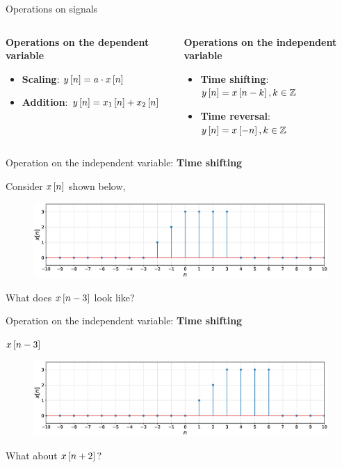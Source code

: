 \documentclass[aspectratio=169]{beamer}
\let\olditem\item
\renewcommand{\item}{\setlength{\itemsep}{\fill}\olditem}
\def\ls{\ensuremath\left[}
\def\rs{\ensuremath\right]}
\begin{document}
\begin{frame}[t]{Operations on signals}

\begin{columns}[t]
  \begin{column}{.45\linewidth}
  \textbf{Operations on the dependent variable}
  \begin{itemize}
    \item \textbf{Scaling}: $y\ls n \rs = a \cdot x\ls n \rs$
    \item \textbf{Addition}: $y\ls n \rs = x_1\ls n \rs + x_2\ls n \rs$
  \end{itemize}
  \end{column}

  \begin{column}{.48\linewidth}
  \textbf{Operations on the independent variable}
  \begin{itemize}
    \item \textbf{Time shifting}: $y\ls n \rs = x \ls n - k \rs, k \in \mathbb{Z}$
    \item \textbf{Time reversal}: $y\ls n \rs = x \ls -n \rs, k \in \mathbb{Z}$
  \end{itemize}
  \end{column}
\end{columns}

\end{frame}

\begin{frame}{Operation on the independent variable: \textbf{Time shifting}}

Consider $x\ls n \rs$ shown below,

\begin{figure}
\includegraphics[width=\textwidth]{img/discsig.eps}
\end{figure}

What does $x\ls n - 3\rs$ look like?
\end{frame}

\begin{frame}{Operation on the independent variable: \textbf{Time shifting}}

$x\ls n - 3\rs$ 

\begin{figure}
\includegraphics[width=\textwidth]{img/discsig-shift.eps}
\end{figure}

What about $x\ls n + 2\rs$?

\end{frame}
\end{document}

